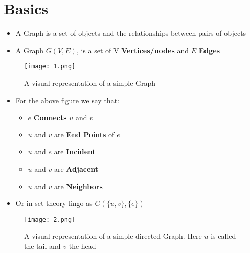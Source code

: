 \chapter{Basics}
\begin{itemize}
\item A Graph is a set of objects and the relationships between pairs of objects
\item A Graph $G(V,E)$, is a set of V \textbf{Vertices/nodes} and $E$ \textbf{Edges}
\end{itemize}
\begin{figure}[h]
	\centering
\texttt{[image: 1.png]}
\caption{A visual representation of a simple Graph}
\end{figure}
\begin{itemize}
\item For the above figure we say that:
\begin{itemize}
\item $e$ \textbf{Connects} $u$ and $v$
\item $u$ and $v$ are \textbf{End Points} of $e$
\item $u$ and $e$ are \textbf{Incident}
\item $u$ and $v$ are \textbf{Adjacent}
\item $u$ and $v$ are \textbf{Neighbors}
\end{itemize}
\item Or in set theory lingo as $G(\{u,v\},\{e\})$
\end{itemize}
\begin{figure}[h]\label{fig_2}
	\centering
	\texttt{[image: 2.png]}
	\caption{A visual representation of a simple directed Graph. Here $u$ is called the tail and $v$ the head}
\end{figure}
